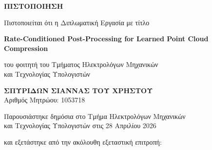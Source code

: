 \begin{center}
  {\large\bfseries{}ΠΙΣΤΟΠΟΙΗΣΗ}
\end{center}

\vspace{0.8em}

\begin{center}
  Πιστοποιείται ότι η Διπλωματική Εργασία με τίτλο
\end{center}

\vspace{0.5em}

\begin{center}
  {\bfseries Rate-Conditioned Post-Processing for Learned Point Cloud Compression}
\end{center}

\vspace{0.5em}

\begin{center}
  του φοιτητή του Τμήματος Ηλεκτρολόγων Μηχανικών\\
  και Τεχνολογίας Υπολογιστών%
\end{center}

\vspace{0.5em}

\begin{center}
  {\large\bfseries{}ΣΠΥΡΙΔΩΝ ΣΙΑΝΝΑΣ ΤΟΥ ΧΡΗΣΤΟΥ}\\[0.4em]
  Αριθμός Μητρώου: 1053718
\end{center}

\vspace{0.6em}

\begin{center}
  Παρουσιάστηκε δημόσια στο Τμήμα Ηλεκτρολόγων Μηχανικών\\
  και Τεχνολογίας Υπολογιστών στις 28 Απριλίου 2026%
\end{center}

\vspace{0.4em}

\begin{center}
  και εξετάστηκε από την ακόλουθη εξεταστική επιτροπή:%
\end{center}

\vspace{0.5em}

